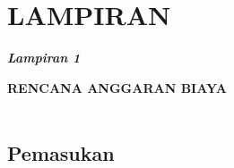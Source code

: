 \appendix
\chapter*{LAMPIRAN}
\setcounter{section}{0} %
\renewcommand{\thesection}{\Alph{section}}
\renewcommand{\thesubsection}{\arabic{subsection}}
\setcounter{page}{1}

\textbf{\textit{Lampiran 1}}\\

\begin{center}
        \textbf{\MakeUppercase{\large{rencana anggaran biaya}}}\\
        \textbf{\MakeUppercase{\normalsize{\judulproyek}}}\\
\end{center}

\section{Pemasukan}


